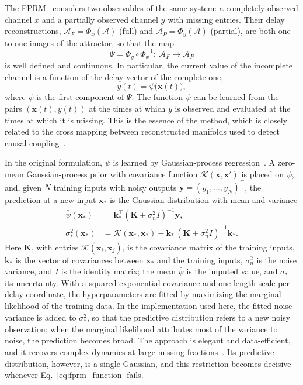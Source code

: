 The FPRM~\cite{Wu2026FPRM} considers two observables of the same system: a completely observed channel $x$ and a partially observed channel $y$ with missing entries. Their delay reconstructions, $\mathcal A_F=\Phi_x(\mathcal A)$ (full) and $\mathcal A_P=\Phi_y(\mathcal A)$ (partial), are both one-to-one images of the attractor, so that the map
\begin{equation}
\Psi = \Phi_y\circ\Phi_x^{-1}:\ \mathcal A_F\to\mathcal A_P
\label{eq:fprm_map}
\end{equation}
is well defined and continuous. In particular, the current value of the incomplete channel is a function of the delay vector of the complete one,
\begin{equation}
y(t) = \psi\bigl(\mathbf x(t)\bigr),
\label{eq:fprm_function}
\end{equation}
where $\psi$ is the first component of $\Psi$. The function $\psi$ can be learned from the pairs $(\mathbf x(t),y(t))$ at the times at which $y$ is observed and evaluated at the times at which it is missing. This is the essence of the method, which is closely related to the cross mapping between reconstructed manifolds used to detect causal coupling~\cite{Sugihara2012}.

In the original formulation, $\psi$ is learned by Gaussian-process regression~\cite{Rasmussen2006}. A zero-mean Gaussian-process prior with covariance function $\mathcal K(\mathbf x,\mathbf x')$ is placed on $\psi$, and, given $N$ training inputs with noisy outputs $\mathbf y=(y_1,\dots,y_N)^{\top}$, the prediction at a new input $\mathbf x_*$ is the Gaussian distribution with mean and variance
\begin{equation}
\begin{aligned}
\bar\psi(\mathbf x_*) &= \mathbf k_*^{\top}(\mathbf K+\sigma_n^{2}I)^{-1}\mathbf y,\\
\sigma_*^{2}(\mathbf x_*) &= \mathcal K(\mathbf x_*,\mathbf x_*) - \mathbf k_*^{\top}(\mathbf K+\sigma_n^{2}I)^{-1}\mathbf k_* .
\end{aligned}
\label{eq:gpr}
\end{equation}
Here $\mathbf K$, with entries $\mathcal K(\mathbf x_i,\mathbf x_j)$, is the covariance matrix of the training inputs, $\mathbf k_*$ is the vector of covariances between $\mathbf x_*$ and the training inputs, $\sigma_n^{2}$ is the noise variance, and $I$ is the identity matrix; the mean $\bar\psi$ is the imputed value, and $\sigma_*$ its uncertainty. With a squared-exponential covariance and one length scale per delay coordinate, the hyperparameters are fitted by maximizing the marginal likelihood of the training data. In the implementation used here, the fitted noise variance is added to $\sigma_*^{2}$, so that the predictive distribution refers to a new noisy observation; when the marginal likelihood attributes most of the variance to noise, the prediction becomes broad. The approach is elegant and data-efficient, and it recovers complex dynamics at large missing fractions~\cite{Wu2026FPRM}. Its predictive distribution, however, is a single Gaussian, and this restriction becomes decisive whenever Eq.~\eqref{eq:fprm_function} fails.

